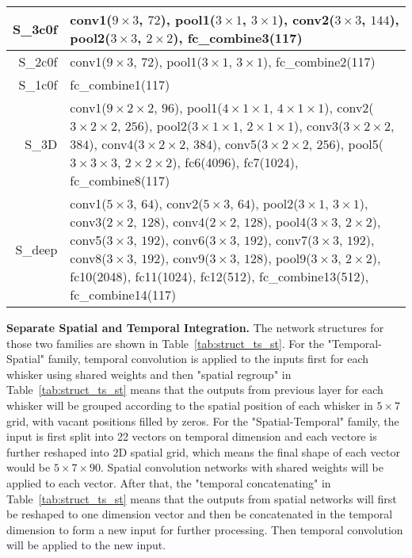 \begin{table}[h]
\begin{tabularx}{\textwidth}{r|X}
\hline
S\_3c0f & conv1($9\times3$, $72$), pool1($3\times1$, $3\times1$), conv2($3\times3$, $144$), pool2($3\times3$, $2\times2$), fc\_combine3(117)\\
\hline
S\_2c0f & conv1($9\times3$, $72$), pool1($3\times1$, $3\times1$), fc\_combine2(117)\\
\hline
S\_1c0f & fc\_combine1(117)\\
\hline
S\_3D & conv1($9\times2\times2$, $96$), pool1($4\times1\times1$, $4\times1\times1$), conv2($3\times2\times2$, $256$), pool2($3\times1\times1$, $2\times1\times1$), conv3($3\times2\times2$, $384$), conv4($3\times2\times2$, $384$), conv5($3\times2\times2$, $256$), pool5($3\times3\times3$, $2\times2\times2$), fc6(4096), fc7(1024), fc\_combine8(117)\\
\hline
S\_deep & conv1($5\times3$, $64$), conv2($5\times3$, $64$), pool2($3\times1$, $3\times1$), conv3($2\times2$, $128$), conv4($2\times2$, $128$), pool4($3\times3$, $2\times2$), conv5($3\times3$, $192$), conv6($3\times3$, $192$), conv7($3\times3$, $192$), conv8($3\times3$, $192$), conv9($3\times3$, $128$), pool9($3\times3$, $2\times2$), fc10(2048), fc11(1024), fc12(512), fc\_combine13(512), fc\_combine14(117)\\
\hline
\end{tabularx}
\label{tab:struct_bm}
\end{table}

\textbf{Separate Spatial and Temporal Integration.} The network structures for those two families are shown in Table~\ref{tab:struct_ts_st}. 
For the "Temporal-Spatial" family, temporal convolution is applied to the inputs first for each whisker using shared weights and then "spatial regroup" in Table~\ref{tab:struct_ts_st} means that the outputs from previous layer for each whisker will be grouped according to the spatial position of each whisker in $5\times7$ grid, with vacant positions filled by zeros.
For the "Spatial-Temporal" family, the input is first split into 22 vectors on temporal dimension and each vectore is further reshaped into 2D spatial grid, which means the final shape of each vector would be $5\times7\times90$.
Spatial convolution networks with shared weights will be applied to each vector.
After that, the "temporal concatenating" in Table~\ref{tab:struct_ts_st} means that the outputs from spatial networks will first be reshaped to one dimension vector and then be concatenated in the temporal dimension to form a new input for further processing. 
Then temporal convolution will be applied to the new input.

